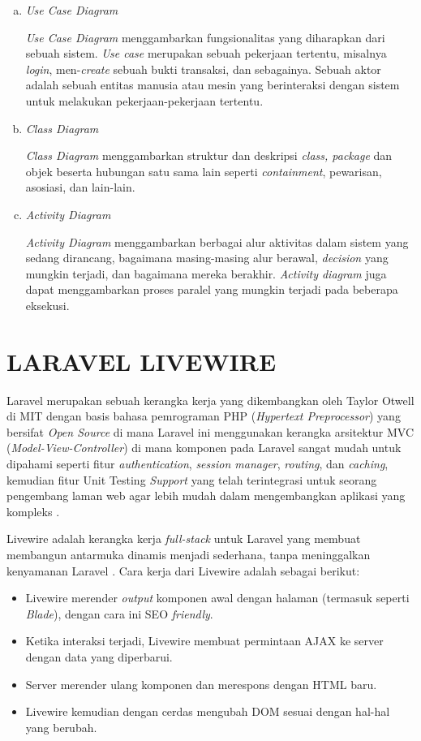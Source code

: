 \begin{enumerate}[a.]
	\item \textit{Use Case Diagram}
	\par \textit{Use Case Diagram} menggambarkan fungsionalitas yang diharapkan dari sebuah sistem. \textit{Use case} merupakan sebuah pekerjaan tertentu, misalnya \textit{login}, men-\textit{create} sebuah bukti transaksi, dan sebagainya. Sebuah aktor adalah sebuah entitas manusia atau mesin yang berinteraksi dengan sistem untuk melakukan pekerjaan-pekerjaan tertentu.
	\item \textit{Class Diagram}
	\par \textit{Class Diagram} menggambarkan struktur dan deskripsi \textit{class, package} dan objek beserta hubungan satu sama lain seperti \textit{containment}, pewarisan, asosiasi, dan lain-lain.
	\item \textit{Activity Diagram}
	\par \textit{Activity Diagram} menggambarkan berbagai alur aktivitas dalam sistem yang sedang dirancang, bagaimana masing-masing alur berawal, \textit{decision} yang mungkin terjadi, dan bagaimana mereka berakhir. \textit{Activity diagram} juga dapat menggambarkan proses paralel yang mungkin terjadi pada beberapa eksekusi.
\end{enumerate}

\section{\uppercase{LARAVEL LIVEWIRE}}
Laravel merupakan sebuah kerangka kerja yang dikembangkan oleh Taylor Otwell di MIT dengan basis bahasa pemrograman PHP (\textit{Hypertext Preprocessor}) yang bersifat \textit{Open Source} di mana Laravel ini menggunakan kerangka arsitektur MVC (\textit{Model-View-Controller}) di mana komponen pada Laravel sangat mudah untuk dipahami seperti fitur \textit{authentication}, \textit{session manager}, \textit{routing}, dan \textit{caching}, kemudian fitur Unit Testing \textit{Support} yang telah terintegrasi untuk seorang pengembang laman web agar lebih mudah dalam mengembangkan aplikasi yang kompleks \citep{sebastian2021perancanagan}.

\par Livewire adalah kerangka kerja \textit{full-stack} untuk Laravel yang membuat membangun antarmuka dinamis menjadi sederhana, tanpa meninggalkan kenyamanan Laravel \citep{livewire2021}. Cara kerja dari Livewire adalah sebagai berikut:

\begin{itemize}
	\item Livewire merender \textit{output} komponen awal dengan halaman (termasuk seperti \textit{Blade}), dengan cara ini SEO \textit{friendly}.
	\item Ketika interaksi terjadi, Livewire membuat permintaan AJAX ke server dengan data yang diperbarui.
	\item Server merender ulang komponen dan merespons dengan HTML baru.
	\item Livewire kemudian dengan cerdas mengubah DOM sesuai dengan hal-hal yang berubah.
\end{itemize}

